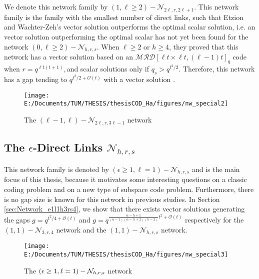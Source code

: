 We denote this network family by $(1,\ell\geq2)-\mathcal{N}_{2\ell,r,2\ell+1}$.
This network family is the family with the smallest number of direct
links, such that Etzion and Wachter-Zeh's vector solution outperforms
the optimal scalar solution, i.e. an vector solution outperforming
the optimal scalar has not yet been found for the network $(0,\ell\geq2)-\mathcal{N}_{h,r,s}$.
When $\ell\geq2$ or $h\geq4$, they proved that this network has
a vector solution based on an $\mathcal{MRD}\left[\ell t\times\ell t,(\ell-1)t\right]_{q}$
code when $r=q^{\ell t\left(t+1\right)},$and scalar solutions only
if $q_{s}>q^{t^{2}/2}$. Therefore, this network has a gap tending
to $q^{t^{2}/2+\mathcal{O}\left(t\right)}$ with a vector solution
.

\begin{figure}[H]
\caption{The $\left(\ell-1,\ell\right)-\mathcal{N}_{2\ell,r,3\ell-1}$ network
\label{fig:network_special2}}

\centering{}\texttt{[image: E:/Documents/TUM/THESIS/thesisCOD\_Ha/figures/nw\_special2]}
\end{figure}


\subsection{The $\epsilon$-Direct Links $\mathcal{N}_{h,r,s}$}

This network family is denoted by $\left(\epsilon\geq1,\ell=1\right)-\mathcal{N}_{h,r,s}$
and is the main focus of this thesis, because it motivates some interesting
questions on a classic coding problem and on a new type of subspace
code problem. Furthermore, there is no gap size is known for this
network in previous studies. In Section \ref{sec:Network_e1l1h3rs4},
we show that there exists vector solutions generating the gaps $g=q^{t^{2}/4+\mathcal{O}(t)}$
and $g=q^{\frac{\alpha-h+1}{\left(\alpha-1\right)\left(\alpha-h+2\right)\left(h-2\right)}t^{2}+\mathcal{O}(t)}$
respectively for the $\left(1,1\right)-\mathcal{N}_{3,r,4}$ network
and the $\left(1,1\right)-\mathcal{N}_{h,r,s}$ network. 

\begin{figure}[H]
\caption{The $\left(\epsilon\protect\geq1,\ell=1\right)-\mathcal{N}_{h,r,s}$
network \label{fig:network_special3}}

\centering{}\texttt{[image: E:/Documents/TUM/THESIS/thesisCOD\_Ha/figures/nw\_special3]}
\end{figure}



